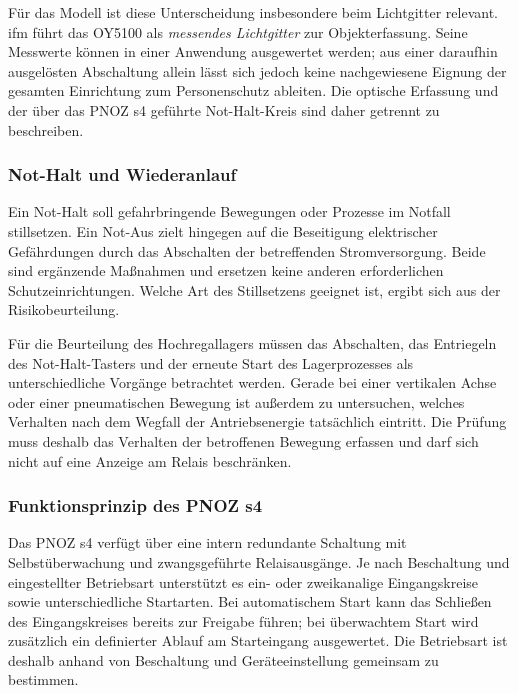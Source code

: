 Für das Modell ist diese Unterscheidung insbesondere beim Lichtgitter relevant. ifm führt das OY5100 als \emph{messendes Lichtgitter} zur Objekterfassung. Seine Messwerte können in einer Anwendung ausgewertet werden; aus einer daraufhin ausgelösten Abschaltung allein lässt sich jedoch keine nachgewiesene Eignung der gesamten Einrichtung zum Personenschutz ableiten. Die optische Erfassung und der über das PNOZ s4 geführte Not-Halt-Kreis sind daher getrennt zu beschreiben. \cite{ifm_oy5100}

\subsubsection{Not-Halt und Wiederanlauf}

Ein Not-Halt soll gefahrbringende Bewegungen oder Prozesse im Notfall stillsetzen. Ein Not-Aus zielt hingegen auf die Beseitigung elektrischer Gefährdungen durch das Abschalten der betreffenden Stromversorgung. Beide sind ergänzende Maßnahmen und ersetzen keine anderen erforderlichen Schutzeinrichtungen. Welche Art des Stillsetzens geeignet ist, ergibt sich aus der Risikobeurteilung. \cite{bghm_nothalt}

Für die Beurteilung des Hochregallagers müssen das Abschalten, das Entriegeln des Not-Halt-Tasters und der erneute Start des Lagerprozesses als unterschiedliche Vorgänge betrachtet werden. Gerade bei einer vertikalen Achse oder einer pneumatischen Bewegung ist außerdem zu untersuchen, welches Verhalten nach dem Wegfall der Antriebsenergie tatsächlich eintritt. Die Prüfung muss deshalb das Verhalten der betroffenen Bewegung erfassen und darf sich nicht auf eine Anzeige am Relais beschränken.

\subsubsection{Funktionsprinzip des PNOZ s4}

Das PNOZ s4 verfügt über eine intern redundante Schaltung mit Selbstüberwachung und zwangsgeführte Relaisausgänge. Je nach Beschaltung und eingestellter Betriebsart unterstützt es ein- oder zweikanalige Eingangskreise sowie unterschiedliche Startarten. Bei automatischem Start kann das Schließen des Eingangskreises bereits zur Freigabe führen; bei überwachtem Start wird zusätzlich ein definierter Ablauf am Starteingang ausgewertet. Die Betriebsart ist deshalb anhand von Beschaltung und Geräteeinstellung gemeinsam zu bestimmen. \cite[Abschn.~Unit features, Safety features und Function description]{pilz_pnoz_s4_grundlagen}

